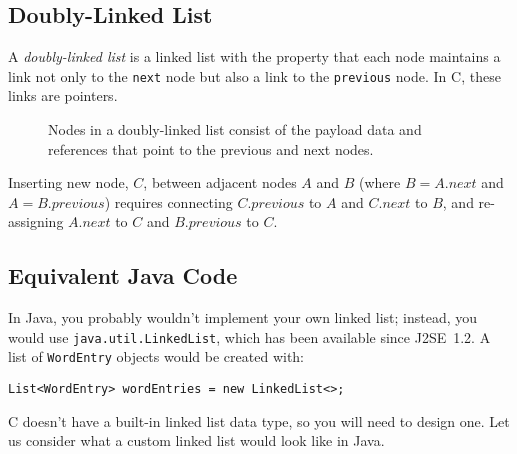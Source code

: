 \subsection{Doubly-Linked List} \label{subsec:doublylinkedlist}

A \textit{doubly-linked list} is a linked list with the property that each node maintains a link not only to the \lstinline{next} node but also a link to the \lstinline{previous} node.
In C, these links are pointers.

\begin{figure}[h]
    \centering
    \caption{Nodes in a doubly-linked list consist of the payload data and references that point to the previous and next nodes.}\label{fig:doubly-linked-list}
\end{figure}

Inserting new node, $C$, between adjacent nodes $A$ and $B$ (where $B = A.next$ and $A = B.previous$) requires connecting $C.previous$ to $A$ and $C.next$ to $B$, and re-assigning $A.next$ to $C$ and $B.previous$ to $C$.



\subsection{Equivalent Java Code} \label{subsec:equivalentjava}

In Java, you probably wouldn't implement your own linked list;
instead, you would use \lstinline{java.util.LinkedList}, which has been available since J2SE~1.2.
A list of \lstinline{WordEntry} objects would be created with:
\begin{lstlisting}[numbers=none]
    List<WordEntry> wordEntries = new LinkedList<>;
\end{lstlisting}

C doesn't have a built-in linked list data type, so you will need to design one.
Let us consider what a custom linked list would look like in Java.

